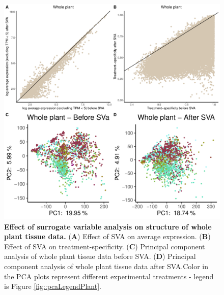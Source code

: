 \documentclass[12pt]{article}
\begin{document}
\begin{figure}[H]
\centering
\includegraphics[width = \linewidth]{figures/appendix_a/pca_beforeAndAfterSva_plant_2023-02-21.pdf}
\caption{\textbf{Effect of surrogate variable analysis on structure of whole plant tissue data.} (\textbf{A}) Effect of SVA on average expression. (\textbf{B}) Effect of SVA on treatment-specificity. (\textbf{C}) Principal component analysis of whole plant tissue data before SVA. (\textbf{D}) Principal component analysis of whole plant tissue data after SVA.Color in the PCA plots represent different experimental treatments - legend is Figure \ref{fig::pcaLegendPlant}.}%
\end{figure}
\end{document}
